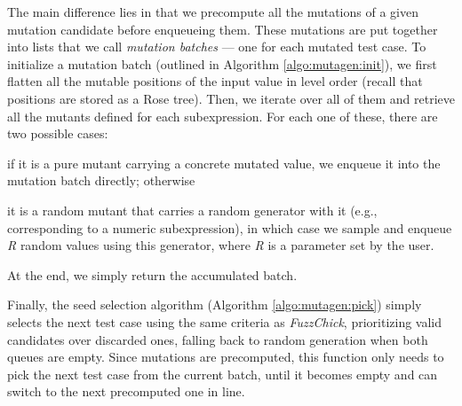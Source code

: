 \documentclass[acmsmall, anonymous]{acmart}
\newcommand{\fuzzchick}{\textit{FuzzChick}\xspace}
\begin{document}
The main difference lies in that we precompute all the mutations of a given
mutation candidate before enqueueing them.
%
These mutations are put together into lists that we call \emph{mutation batches}
--- one for each mutated test case.
%
To initialize a mutation batch (outlined in Algorithm \ref{algo:mutagen:init}),
we first flatten all the mutable positions of the input value in level order
(recall that positions are stored as a Rose tree).
%
Then, we iterate over all of them and retrieve all the mutants defined for each
subexpression.
%
For each one of these, there are two possible cases:
%
\begin{inparaenum}
\item if it is a pure mutant carrying a concrete mutated value, we enqueue it
  into the mutation batch directly; otherwise
\item it is a random mutant that carries a random generator with it (e.g.,
  corresponding to a numeric subexpression), in which case we sample and enqueue
  \textit{R} random values using this generator, where \textit{R} is a parameter
  set by the user.
\end{inparaenum}
%
At the end, we simply return the accumulated batch.


Finally, the seed selection algorithm (Algorithm \ref{algo:mutagen:pick}) simply
selects the next test case using the same criteria as \fuzzchick, prioritizing
valid candidates over discarded ones, falling back to random generation when
both queues are empty.
%
Since mutations are precomputed, this function only needs to pick the next test
case from the current batch, until it becomes empty and can switch to the next
precomputed one in line.
\end{document}
